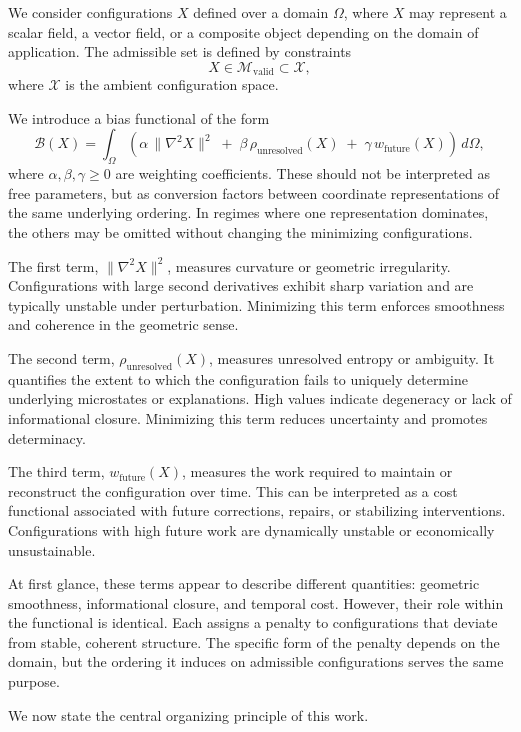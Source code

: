 \documentclass[11pt]{article}
\theoremstyle{plain}
\theoremstyle{definition}
\theoremstyle{remark}
\begin{document}
We consider configurations $X$ defined over a domain $\Omega$, where $X$ may represent a scalar field, a vector field, or a composite object depending on the domain of application. The admissible set is defined by constraints
\[
X \in \mathcal{M}_{\mathrm{valid}} \subset \mathcal{X},
\]
where $\mathcal{X}$ is the ambient configuration space.

We introduce a bias functional of the form
\[
\mathcal{B}(X) = \int_{\Omega} \left( \alpha \, \|\nabla^2 X\|^2 \;+\; \beta \, \rho_{\mathrm{unresolved}}(X) \;+\; \gamma \, w_{\mathrm{future}}(X) \right) \, d\Omega,
\]
where $\alpha, \beta, \gamma \geq 0$ are weighting coefficients. These should not be interpreted as free parameters, but as conversion factors between coordinate representations of the same underlying ordering. In regimes where one representation dominates, the others may be omitted without changing the minimizing configurations.

The first term, $\|\nabla^2 X\|^2$, measures curvature or geometric irregularity. Configurations with large second derivatives exhibit sharp variation and are typically unstable under perturbation. Minimizing this term enforces smoothness and coherence in the geometric sense.

The second term, $\rho_{\mathrm{unresolved}}(X)$, measures unresolved entropy or ambiguity. It quantifies the extent to which the configuration fails to uniquely determine underlying microstates or explanations. High values indicate degeneracy or lack of informational closure. Minimizing this term reduces uncertainty and promotes determinacy.

The third term, $w_{\mathrm{future}}(X)$, measures the work required to maintain or reconstruct the configuration over time. This can be interpreted as a cost functional associated with future corrections, repairs, or stabilizing interventions. Configurations with high future work are dynamically unstable or economically unsustainable.

At first glance, these terms appear to describe different quantities: geometric smoothness, informational closure, and temporal cost. However, their role within the functional is identical. Each assigns a penalty to configurations that deviate from stable, coherent structure. The specific form of the penalty depends on the domain, but the ordering it induces on admissible configurations serves the same purpose.

We now state the central organizing principle of this work.
\end{document}
